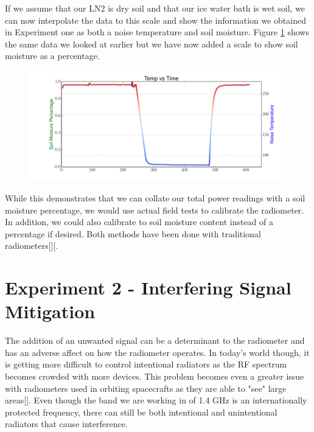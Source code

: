 If we assume that our LN2 is dry soil and that our ice water bath is wet soil, we can now interpolate the data to this scale and show the information we obtained in Experiment one as both a noise temperature and soil moisture.  Figure \ref{SDR_soil} shows the same data we looked at earlier but we have now added a scale to show soil moisture as a percentage.

\begin{figure}[h!tb] \centering

\includegraphics[width=\textwidth]{Experiments/Exp1/sdr_soilmoisture.pdf}
\label{SDR_soil}
\end{figure}

While this demonstrates that we can collate our total power readings with a soil moisture percentage, we would use actual field tests to calibrate the radiometer.  In addition, we could also calibrate to soil moisture content instead of a percentage if desired.  Both methods have been done with traditional radiometers[\cite{Jonard}][\cite{Shi}.

\section{Experiment 2 - Interfering Signal Mitigation}
The addition of an unwanted signal can be a determinant to the radiometer and has an adverse affect on how the radiometer operates.  In today's world though, it is getting more difficult to control intentional radiators as the RF spectrum becomes crowded with more devices.  This problem becomes even a greater issue with radiometers used in orbiting spacecrafts as they are able to "see" large areas[\cite{DeRooRFI}].  Even though the band we are working in of 1.4 GHz is an internationally protected frequency, there can still be both intentional and unintentional radiators that cause interference.

